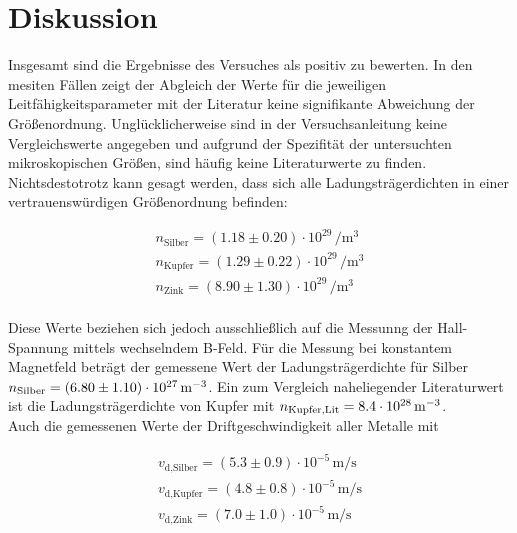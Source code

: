 


\section{Diskussion}
\label{sec:Diskussion}

Insgesamt sind die Ergebnisse des Versuches als positiv zu bewerten. In den mesiten Fällen zeigt der Abgleich der 
Werte für die jeweiligen Leitfähigkeitsparameter mit der Literatur keine signifikante Abweichung der Größenordnung.
Unglücklicherweise sind in der Versuchsanleitung keine Vergleichswerte angegeben und aufgrund der Spezifität der 
untersuchten mikroskopischen Größen, sind häufig keine Literaturwerte zu finden.\\

\noindent Nichtsdestotrotz kann gesagt werden, dass sich alle Ladungsträgerdichten in einer vertrauenswürdigen Größenordnung befinden:

\begin{align*}
    n_\text{Silber} = \left(1.18 \pm 0.20\right)\cdot{}10^{29}\,\unit{\per\cubic\meter}\\
    n_\text{Kupfer} = \left(1.29 \pm 0.22\right)\cdot{}10^{29}\,\unit{\per\cubic\meter}\\
    n_\text{Zink} = \left(8.90 \pm 1.30\right)\cdot{}10^{29}\,\unit{\per\cubic\meter}\\
\end{align*}

\noindent Diese Werte beziehen sich jedoch ausschließlich auf die Messunng der Hall-Spannung mittels wechselndem B-Feld.
Für die Messung bei konstantem Magnetfeld beträgt der gemessene Wert der Ladungsträgerdichte für Silber 
$n_\text{Silber} = \left(6.80 \pm 1.10\right)\cdot{}10^{27}\,\unit[per-mode=reciprocal]{\per\cubic\meter}$. Ein zum Vergleich naheliegender
Literaturwert ist die Ladungsträgerdichte von Kupfer mit $n_\text{Kupfer,Lit} = 8.4\cdot{}10^{28}\,\unit[per-mode=reciprocal]{
\per\cubic\meter}$\cite{leitfaehigkeiten}.\\

\noindent Auch die gemessenen Werte der Driftgeschwindigkeit aller Metalle mit 

\begin{align*}
    v_\text{d,Silber} = \left(5.3 \pm 0.9\right)\cdot{}10^{-5}\,\unit{\meter\per\second}\\
    v_\text{d,Kupfer} = \left(4.8 \pm 0.8\right)\cdot{}10^{-5}\,\unit{\meter\per\second}\\
    v_\text{d,Zink} = \left(7.0 \pm 1.0\right)\cdot{}10^{-5}\,\unit{\meter\per\second}\\
\end{align*}

